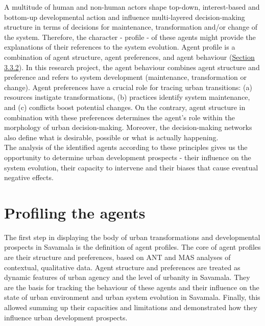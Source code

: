 \documentclass[11pt]{report}
\begin{document}
A multitude of human and non-human actors shape top-down, interest-based and bottom-up developmental action and influence multi-layered decision-making structure in terms of decisions for maintenance, transformation and/or change of the system. 
Therefore, the character - profile - of these agents might provide the explanations of their references to the system evolution.
Agent profile is a combination of agent structure, agent preferences, and agent behaviour (\href{Section 3.3.2}{Section 3.3.2}).
In this research project, the agent behaviour combines agent structure and preference and refers to system development (maintenance, transformation or change). 
Agent preferences have a crucial role for tracing urban transitions:
(a) resources instigate transformations,
(b) practices identify system maintenance,
and
(c) conflicts boost potential changes.
On the contrary, agent structure in combination with these preferences determines the agent's role within the morphology of urban decision-making.
Moreover, the decision-making networks also define what is desirable, possible or what is actually happening.
\\

The analysis of the identified agents according to these principles gives us the opportunity to determine urban development prospects - their influence on the system evolution, their capacity to intervene and their biases that cause eventual negative effects.

\section{Profiling the agents}

The first step in displaying the body of urban transformations and developmental prospects in Savamala is the definition of agent profiles.
The core of agent profiles are their structure and preferences, based on ANT and MAS analyses of contextual, qualitative data. Agent structure and preferences are treated as dynamic features of urban agency and the level of urbanity in Savamala.
They are the basis for tracking the behaviour of these agents and their influence on the state of urban environment and urban system evolution in Savamala.
Finally, this allowed summing up their capacities and limitations and demonstrated how they influence urban development prospects.
\\
\end{document}
